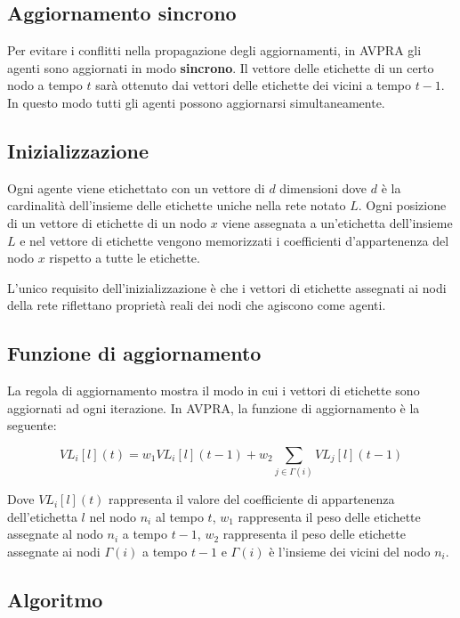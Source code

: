 \documentclass[a4paper,12pt]{report}
\begin{document}
		\subsection{Aggiornamento sincrono}
		Per evitare i conflitti nella propagazione degli aggiornamenti, in AVPRA gli agenti sono aggiornati in modo \textbf{sincrono}. Il vettore delle etichette di un certo nodo a tempo $t$ sarà ottenuto dai vettori delle etichette dei vicini a tempo $t-1$. In questo modo tutti gli agenti possono aggiornarsi simultaneamente.
	
		\subsection{Inizializzazione}
		Ogni agente viene etichettato con un vettore di $d$ dimensioni dove $d$ è la cardinalità dell'insieme delle etichette uniche nella rete notato $L$. Ogni posizione di un vettore di etichette di un nodo $x$ viene assegnata a un'etichetta dell'insieme $L$ e nel vettore di etichette vengono memorizzati i coefficienti d'appartenenza del nodo $x$ rispetto a tutte le etichette. 
		
		L'unico requisito dell'inizializzazione è che i vettori di etichette assegnati ai nodi della rete riflettano proprietà reali dei nodi che agiscono come agenti. \cite{avpra}

		\subsection{Funzione di aggiornamento}
		La regola di aggiornamento mostra il modo in cui i vettori di etichette sono aggiornati ad ogni iterazione. In AVPRA, la funzione di aggiornamento è la seguente:
		
		\begin{equation}
		VL_i [l] (t) = w_1 VL_i [l] (t-1) + w_2 \sum_{j \in \Gamma(i)} VL_j [l](t-1)
		\end{equation}

		Dove $VL_i[l](t)$ rappresenta il valore del coefficiente di appartenenza dell'etichetta $l$ nel nodo $n_i$ al tempo $t$, $w_1$ rappresenta il peso delle etichette assegnate al nodo $n_i$ a tempo $t - 1$, $w_2$ rappresenta il peso delle etichette assegnate ai nodi $\Gamma(i)$ a tempo $t - 1$ e $\Gamma(i)$ è l'insieme dei vicini del nodo $n_i$. \cite{avpra}

		\subsection{Algoritmo}
\end{document}
